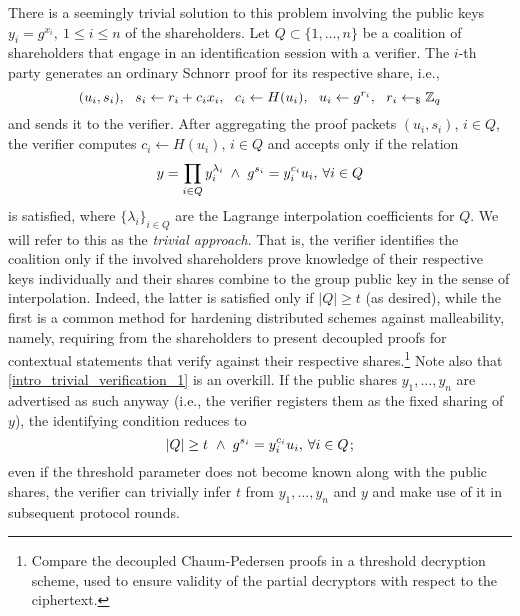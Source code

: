 \documentclass[psamsfonts, reqno]{amsart}
\theoremstyle{definition}
\theoremstyle{remark}
\numberwithin{equation}{section}
\begin{document}
There is a seemingly trivial solution to this problem
involving the public keys
$y_i = g ^ {x_i},\ 1 \le i \le n$
of the shareholders.
Let $Q \subset \{1, \dots, n\}$
be a coalition of shareholders that engage in
an identification session with a verifier.
The $i$-th party generates
an ordinary Schnorr proof
for its respective share, i.e.,
\vspace{5pt}
\begin{equation*}
(u_i, s_i),
\ \ s_i \leftarrow r_i + c_i x_i,
\ \ c_i \leftarrow H(u_i),
\ \ u_i \leftarrow g ^ {r_i},
\ \ r_i \leftarrow_\$ \mathbb{Z}_q
\vspace{5pt}
\end{equation*}
and sends it to the verifier.
After aggregating the proof packets
$(u_i, s_i)$, $i \in Q$,
the verifier computes
$c_i \leftarrow H(u_i)$, $i \in Q$
and accepts only if the relation
\vspace{5pt}
\begin{equation}\label{intro_trivial_verification_1}
y = \prod_{i \in Q} y_i ^{\lambda_i}
\hspace{2.50pt}
\land
\hspace{3pt}
g ^ {s_i} = y_i ^ {c_i} u_i,
\hspace{2pt}
\forall i \in Q
\vspace{5pt}
\end{equation}
is satisfied, where $\{\lambda_i\}_{i \in Q}$ are the Lagrange
interpolation coefficients for $Q$.
We will refer to this as the \textit{trivial approach}.
That is, the verifier identifies the coalition
only if the involved shareholders
prove knowledge of their respective keys individually
and their shares combine to the group public key
in the sense of interpolation.
Indeed, the latter is satisfied only if $|Q| \ge t$
(as desired),
while the first is a common method for hardening
distributed schemes against malleability, namely,
requiring from the shareholders to present decoupled
proofs for contextual statements
that verify against their respective
shares.\footnote{Compare
the decoupled Chaum-Pedersen proofs
in a threshold decryption scheme, used to ensure
validity of the partial decryptors with respect to the
ciphertext.}
Note also that \eqref{intro_trivial_verification_1} is an overkill.
If the public shares $y_1, \dots, y_n$ are advertised
as such anyway (i.e., the verifier registers them
as the fixed sharing of $y$),
the identifying condition reduces to
\vspace{5pt}
\begin{equation}\label{intro_trivial_verification_2}
|Q| \ge t
\hspace{3.50pt}
\land
\hspace{3pt}
g ^ {s_i} = y_i ^ {c_i} u_i,
\hspace{2pt}
\forall i \in Q
\hspace{1pt};
\vspace{5pt}
\end{equation}
even if the threshold parameter does not become known
along with the public shares,
the verifier can trivially infer $t$ from $y_1, \dots, y_n$ and $y$
and make use of it in subsequent protocol rounds.
\end{document}
